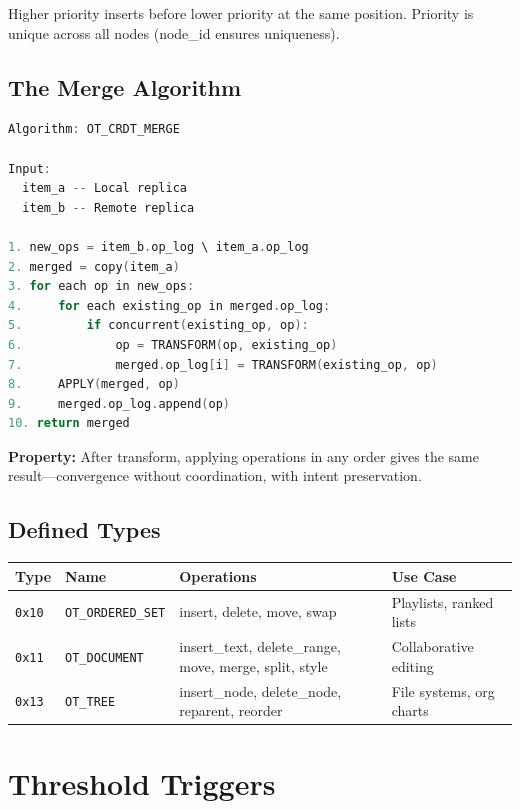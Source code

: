 \documentclass[sigconf,nonacm]{acmart}
\begin{document}
Higher priority inserts before lower priority at the same position. Priority is unique across all nodes (node\_id ensures uniqueness).

\subsection{The Merge Algorithm}

\begin{lstlisting}[language=C]
Algorithm: OT_CRDT_MERGE

Input:
  item_a -- Local replica
  item_b -- Remote replica

1. new_ops = item_b.op_log \ item_a.op_log
2. merged = copy(item_a)
3. for each op in new_ops:
4.     for each existing_op in merged.op_log:
5.         if concurrent(existing_op, op):
6.             op = TRANSFORM(op, existing_op)
7.             merged.op_log[i] = TRANSFORM(existing_op, op)
8.     APPLY(merged, op)
9.     merged.op_log.append(op)
10. return merged
\end{lstlisting}

\textbf{Property:} After transform, applying operations in any order gives the same result---convergence without coordination, with intent preservation.

\subsection{Defined Types}

\vspace{4pt}
{\footnotesize
\begin{tabularx}{\columnwidth}{p{0.8cm}p{2cm}Xp{2cm}}
\toprule
\textbf{Type} & \textbf{Name} & \textbf{Operations} & \textbf{Use Case} \\
\midrule
\texttt{0x10} & \texttt{OT\_ORDERED\_SET} & insert, delete, move, swap & Playlists, ranked lists \\
\texttt{0x11} & \texttt{OT\_DOCUMENT} & insert\_text, delete\_range, move, merge, split, style & Collaborative editing \\
\texttt{0x13} & \texttt{OT\_TREE} & insert\_node, delete\_node, reparent, reorder & File systems, org charts \\
\bottomrule
\end{tabularx}
}

\section{Threshold Triggers}
\end{document}

